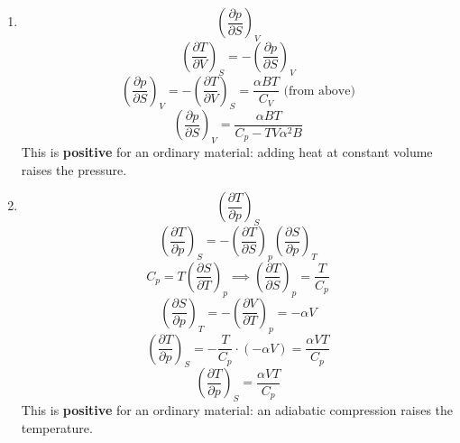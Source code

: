 \documentclass{article}
\begin{document}
\begin{enumerate}
\begin{enumerate}
        \item \[\left( \frac{\partial p}{\partial S}\right)_V\]
        \[\left(\frac{\partial T}{\partial V}\right)_S = -\left(\frac{\partial p}{\partial S}\right)_V\]
        \[\left(\frac{\partial p}{\partial S}\right)_V = -\left(\frac{\partial T}{\partial V}\right)_S = \frac{\alpha BT}{C_V} \text{ (from above)}\]
        \[\boxed{\left(\frac{\partial p}{\partial S}\right)_V = \frac{\alpha BT}{C_p - TV\alpha^2B}}\]
        This is \textbf{positive} for an ordinary material: adding heat at constant volume raises the pressure.
 
        \item \[\left( \frac{\partial T}{\partial p}\right)_S\]
        \[\left(\frac{\partial T}{\partial p}\right)_S = -\left(\frac{\partial T}{\partial S}\right)_p \left(\frac{\partial S}{\partial p}\right)_T\]
        \[C_p = T\left(\frac{\partial S}{\partial T}\right)_p \implies \left(\frac{\partial T}{\partial S}\right)_p = \frac{T}{C_p}\]
        \[\left(\frac{\partial S}{\partial p}\right)_T = -\left(\frac{\partial V}{\partial T}\right)_p = -\alpha V\]
        \[\left(\frac{\partial T}{\partial p}\right)_S = -\frac{T}{C_p}\cdot(-\alpha V) = \frac{\alpha VT}{C_p}\]
        \[\boxed{\left(\frac{\partial T}{\partial p}\right)_S = \frac{\alpha VT}{C_p}}\]
        This is \textbf{positive} for an ordinary material: an adiabatic compression raises the temperature.
        \end{enumerate}
    \end{enumerate}
\end{document}

